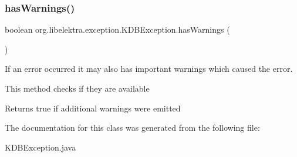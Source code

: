 \subsubsection{\texorpdfstring{has\+Warnings()}{hasWarnings()}}
{\footnotesize\ttfamily boolean org.\+libelektra.\+exception.\+K\+D\+B\+Exception.\+has\+Warnings (\begin{DoxyParamCaption}{ }\end{DoxyParamCaption})\hspace{0.3cm}{\ttfamily [inline]}}



If an error occurred it may also has important warnings which caused the error. 

This method checks if they are available

\begin{DoxyReturn}{Returns}
true if additional warnings were emitted 
\end{DoxyReturn}


The documentation for this class was generated from the following file\+:\begin{DoxyCompactItemize}
\item 
K\+D\+B\+Exception.\+java\end{DoxyCompactItemize}
